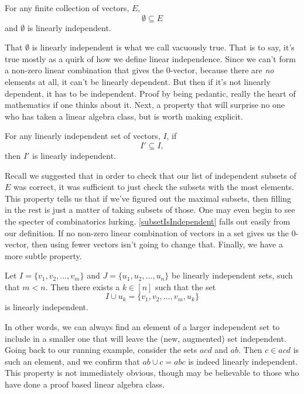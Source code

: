 \documentclass[12pt,oneside]{../../sfsuthesis}
\begin{document}
\begin{property}\th\label{emptyIsIndependent}
    For any finite collection of vectors, \( E \),
    \[
        \emptyset \subseteq E
    \]
    and \( \emptyset \) is linearly independent.
\end{property}
That \( \emptyset \) is linearly independent is what we call vacuously true.
That is to say, it's true mostly as a quirk of how we define linear independence.
Since we can't form a non-zero linear combination that gives the 0-vector, because there are \emph{no} elements at all, it can't be linearly dependent.
But then if it's not linearly dependent, it has to be independent.
Proof by being pedantic, really the heart of mathematics if one thinks about it.
Next, a property that will surprise no one who has taken a linear algebra class, but is worth making explicit.

\begin{property}\th\label{subsetIsIndependent}
    For any linearly independent set of vectors, \( I \), if
    \[
        I' \subseteq I,
    \]
    then \( I' \) is linearly independent.
\end{property}
Recall we suggested that in order to check that our list of independent subsets of \( E \) was correct, it was sufficient to just check the subsets with the most elements.
This property tells us that if we've figured out the maximal subsets, then filling in the rest is just a matter of taking subsets of those.
One may even begin to see the specter of combinatorics lurking.
\th\ref{subsetIsIndependent} falls out easily from our definition.
If no non-zero linear combination of vectors in a set gives us the 0-vector, then using fewer vectors isn't going to change that.
Finally, we have a more subtle property.

\begin{property}\th\label{linearAugmentation}
    Let \( I = \{v_1, v_2, \ldots, v_m\} \) and \( J = \{ u_1, u_2, \ldots, u_n \} \) be linearly independent sets, such that \( m < n \).
    Then there exists a \( k \in [n] \) such that the set
    \[
        I \cup u_k = \{v_1, v_2, \ldots, v_m, u_k \}
    \]
    is linearly independent.
\end{property}
In other words, we can always find an element of a larger independent set to include in a smaller one that will leave the (new, augmented) set independent.
Going back to our running example, consider the sets \( acd \) and \( ab \).
Then \( c \in acd \) is such an element, and we confirm that \( ab \cup c = abc \) is indeed linearly independent.
This property is not immediately obvious, though may be believable to those who have done a proof based linear algebra class.
\end{document}

